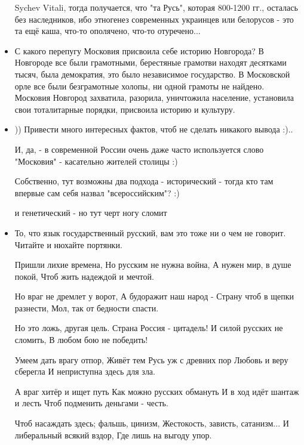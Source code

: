 \begin{itemize}
Sychev Vitali, тогда получается, что "та Русь", которая 800-1200 гг., осталась
без наследников, ибо этногенез современных украинцев или белорусов - это та ещё
каша, что-то ополячено, что-то отуречено...

\item {}

С какого перепугу Московия присвоила себе историю Новгорода? В Новгороде все
были грамотными, берестяные грамотви находят десятками тысяч, была демократия,
это было независимое государство. В Московской орле все были безграмотные
холопы, ни одной грамоты не найдено. Московия Новгород захватила, разорила,
уничтожила население, установила свои тоталитарные порядки, присвоила историю и
культуру.

\item {}

)) Привести много интересных фактов, чтоб не сделать никакого вывода :)..

И, да, - в современной России очень даже часто используется слово "Московия" -
касательно жителей столицы :)

Собственно, тут возможны два подхода - исторический - тогда кто там впервые сам
себя назвал "всероссийским"? :)

и генетический - но тут черт ногу сломит

\item {}

То, что язык государственный русский, вам это тоже ни о чем не говорит. Читайте и нюхайте портянки.


\begin{multicols}{2}
	\obeycr
Пришли лихие времена,
Но русским не нужна война,
А нужен мир, в душе покой,
Чтоб жить надеждой и мечтой.

Но враг не дремлет у ворот,
А будоражит наш народ -
Страну чтоб в щепки разнести,
Мол, так от бедности спасти.

Но это ложь, другая цель.
Страна Россия - цитадель!
И силой русских не сломить,
В любом бою не победить!

Умеем дать врагу отпор,
Живёт тем Русь уж с древних пор
Любовь и веру сберегла
И неприступна здесь для зла.

А враг хитёр и ищет путь
Как можно русских обмануть
И в ход идёт шантаж и лесть
Чтоб подменить деньгами - честь.

Чтоб насаждать здесь; фальшь, цинизм,
Жестокость, зависть, сатанизм...
И либеральный всякий вздор,
Где лишь на выгоду упор.


\end{multicols}
\end{itemize}

